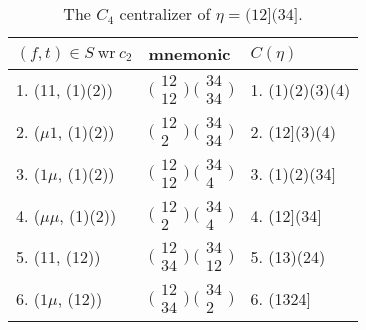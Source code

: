 \documentclass{surv-l}
\numberwithin{equation}{section}
\numberwithin{table}{section}
\numberwithin{figure}{section}
\theoremstyle{definition}
\begin{document}
\begin{table}[]
\caption{The $C_{4}$ centralizer of $\eta=(12](34]$.\label{tab5.17.1}}
{\begin{tabular}{@{}|l|l|l|@{}}
\hline
\multicolumn{1}{|l|}{$(f,t)\in S\ \mathrm{wr}\ c_{2}$}&  \multicolumn{1}{|l|}{mnemonic}& \multicolumn{1}{|l|}{$C(\eta)$} \\
\hline
1. (11, (1)(2))&$\big(\!\begin{smallmatrix}12 \\ 12\end{smallmatrix}\!\big)\ \big(\!\begin{smallmatrix}34 \\ 34\end{smallmatrix}\!\big)$&1. (1)(2)(3)(4) \\[3pt]
2. ($\mu 1$, (1)(2))&$\big(\!\begin{smallmatrix}12 \\ 2\end{smallmatrix}\!\big)\ \big(\!\begin{smallmatrix}34 \\ 34\end{smallmatrix}\!\big)$&2. (12](3)(4) \\[3pt]
3. ($1\mu$, (1)(2))&$\big(\!\begin{smallmatrix}12 \\ 12\end{smallmatrix}\!\big)\ \big(\!\begin{smallmatrix}34 \\ 4\end{smallmatrix}\!\big)$&3. (1)(2)(34] \\[3pt]
4. ($\mu\mu$, (1)(2))&$\big(\!\begin{smallmatrix}12 \\ 2\end{smallmatrix}\!\big)\ \big(\!\begin{smallmatrix}34 \\ 4\end{smallmatrix}\!\big)$&4. (12](34] \\[3pt]
5. (11, (12))&$\big(\!\begin{smallmatrix}12 \\ 34\end{smallmatrix}\!\big)\ \big(\!\begin{smallmatrix}34 \\ 12\end{smallmatrix}\!\big)$&5. (13)(24) \\[3pt]
6. ($1\mu$, (12))&$\big(\!\begin{smallmatrix}12 \\ 34\end{smallmatrix}\!\big)\ \big(\!\begin{smallmatrix}34 \\ 2\end{smallmatrix}\!\big)$&6. (1324] \\[3pt]

\end{tabular}}
\end{table}
\end{document}
